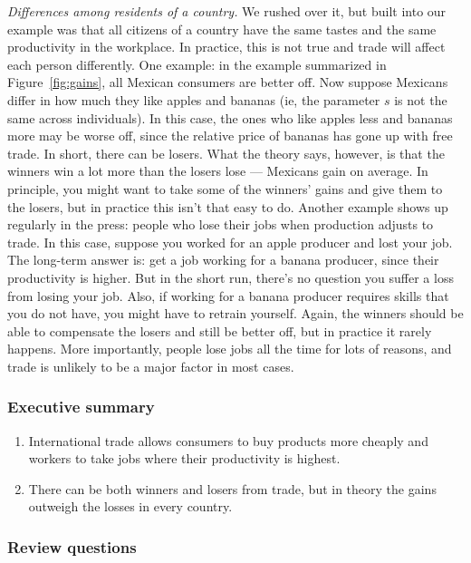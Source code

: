 \documentclass[letterpaper,12pt]{article}
\begin{document}
\textit{Differences among residents of a country.} We rushed over
it, but built into our example was that all citizens of a
country have the same tastes and the same productivity in the
workplace. In practice, this is not true and trade will affect
each person differently. One example: in the example summarized in
Figure~\ref{fig:gains}, all Mexican consumers are better off. Now
suppose Mexicans differ in how much they like apples and bananas
(ie, the parameter $s$ is not the same across
individuals). In this case, the ones who like apples less and
bananas more may be worse off, since the relative price of bananas
has gone up with free trade. In short, there can be losers. What
the theory says, however, is that the winners win a lot more than
the losers lose --- Mexicans gain on average.
In principle, you might want to take some of the winners' gains and give them to the
losers, but in practice this isn't that easy to do. Another
example shows up regularly in the press: people who lose their
jobs when production adjusts to trade.  In this case, suppose you
worked for an apple producer and lost your job. The long-term
answer is:  get a job working for a banana producer, since their
productivity is higher. But in the short run, there's no question
you suffer a loss from losing your job. Also, if working for a
banana producer requires skills that you do not have, you might
have to retrain yourself. Again, the winners should be able to
compensate the losers and still be better off, but in practice it
rarely happens.
More importantly, people lose jobs all the time for lots of
reasons, and trade is unlikely to be a major factor in most cases.


\subsubsection*{Executive summary}

\begin{enumerate}
\item International trade allows consumers to buy products more cheaply
and workers to take jobs where their productivity is highest.

\item There can be both winners and losers from trade,
but in theory the gains outweigh the losses in every country.

\end{enumerate}


\subsubsection*{Review questions}
\end{document}
